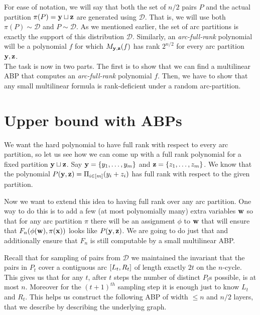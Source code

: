 For ease of notation, we will say that both the set of $n/2$ pairs $P$ and the actual partition $\pi(P)=\mathbf{y} \sqcup \mathbf{z}$ are generated using $\mathcal{D}$.
That is, we will use both $\pi(P) \sim \mathcal{D}$ and $P \sim \mathcal{D}$.
As we mentioned earlier, the set of arc partitions is exactly the support of this distribution $\mathcal{D}$.
Similarly, an \emph{arc-full-rank} polynomial will be a polynomial $f$ for which $M_{\mathbf{y},\mathbf{z}}(f)$ has rank $2^{n/2}$ for every arc partition $\mathbf{y},\mathbf{z}$.\\

The task is now in two parts.
The first is to show that we can find a multilinear ABP that computes an \emph{arc-full-rank} polynomial $f$.
Then, we have to show that any small multilinear formula is rank-deficient under a random arc-partition.

\section{Upper bound with ABPs}

We want the hard polynomial to have full rank with respect to every arc partition, so let us see how we can come up with a full rank polynomial for a fixed partition $\mathbf{y} \sqcup \mathbf{z}$. Say $\mathbf{y} = \left\{y_1,\ldots,y_m\right\}$ and $\mathbf{z} = \left\{z_1,\ldots,z_m\right\}$. We know that the polynomial $P(\mathbf{y},\mathbf{z}) = \Pi_{i \in [m]} (y_i + z_i)$ has full rank with respect to the given partition.

Now we want to extend this idea to having full rank over any arc partition. One way to do this is to add a few (at most polynomially many) extra variables $\mathbf{w}$ so that for any arc partition $\pi$ there will be an assignment $\phi$ to $\mathbf{w}$ that will ensure that $F_n(\phi(\mathbf{w}),\pi(\mathbf{x}))$ looks like $P(\mathbf{y},\mathbf{z})$. We are going to do just that and additionally ensure that $F_n$ is still computable by a small multilinear ABP.

Recall that for sampling of pairs from $\mathcal{D}$ we maintained the invariant that the pairs in $P_t$ cover a contiguous arc $\left[L_t, R_t\right]$ of length exactly $2t$ on the $n$-cycle. This gives us that for any $t$, after $t$ steps the number of distinct $P_t$s possible, is at most $n$. Moreover for the $(t+1)^{th}$ sampling step it is enough just to know $L_t$ and $R_t$. This helps us construct the following ABP of width $\leq n$ and $n/2$ layers, that we describe by describing the underlying graph.\\

